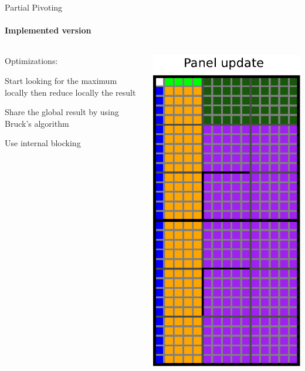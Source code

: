 \begin{frame}{Partial Pivoting}
\framesubtitle{Implemented version}
\begin{columns}
\begin{column}{.50\textwidth}
Optimizations:
\begin{itemize}
{
\item Start looking for the maximum locally then reduce locally the result
\item Share the global result by using Bruck's algorithm}
\item Use internal blocking
\end{itemize}
\end{column}
\hfill
\begin{column}{.50\textwidth}
\begin{center}
\includegraphics[scale=0.3]{panel_update.pdf}
\end{center}
\end{column}
\end{columns}
\end{frame}


